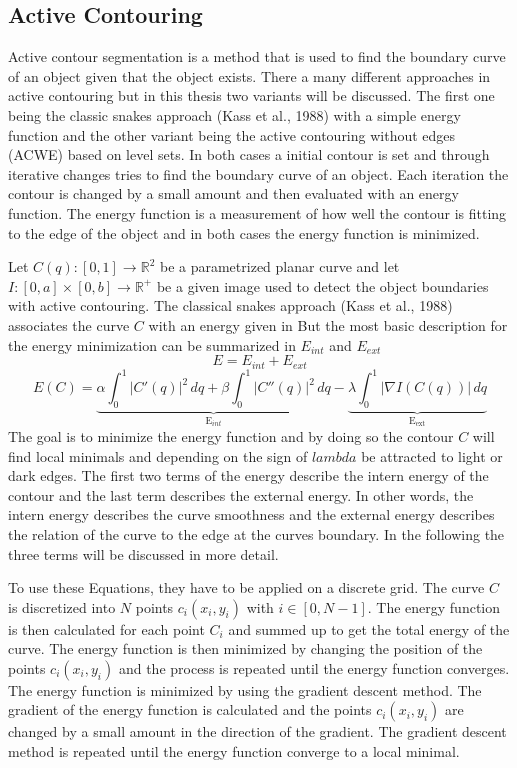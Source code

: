 \subsection{Active Contouring }
Active contour \cite{vondracek_image_2018} segmentation is a method that is used to find the boundary curve of an object given that the object exists. There a many different approaches in active contouring but in this thesis two variants will be discussed. The first one being the classic snakes approach (Kass et al., 1988) \cite{kass_snakes_1988} with a simple energy function and the other variant being the active contouring without edges (ACWE)  based on level sets. In both cases a initial contour is set and through iterative changes tries to find the boundary curve of an object. Each iteration the contour is changed by a small amount and then evaluated with an energy function. The energy function is a measurement of how well the contour is fitting to the edge of the object and in both cases the energy function is minimized.

Let $C(q): [0, 1] \rightarrow \mathbb{R}^2$ be a parametrized planar curve and let $I : [0, a] \times [0, b] \rightarrow \mathbb{R}^+$ be a given image used to detect the object boundaries with active contouring. The classical snakes approach (Kass et al., 1988) \cite{kass_snakes_1988} associates the curve $C$ with an energy given in 
But the most basic description for the energy minimization can be summarized in $E_{int}$ and $E_{ext}$ 
\begin{equation}
    E = E_{int} + E_{ext}
    \label{energy}
\end{equation}
\begin{equation}
        E(C) = \underbrace{\alpha \int_0^1 |C'(q)|^2 \, dq + \beta \int_0^1 |C''(q)|^2 \, dq}_{\text{E}_{int}} - \underbrace{\lambda \int_0^1 |\nabla I (C(q))| \, dq}_{\text{E}_{\text{ext}}}
\label{acgd}
\end{equation}
The goal is to minimize the energy function and by doing so the contour $C$ will find local minimals and depending on the sign of $lambda$ be attracted to light or dark edges. The first two terms of the energy describe the intern energy of the contour and the last term describes the external energy. In other words, the intern energy describes the curve smoothness and the external energy describes the relation of the curve to the edge at the curves boundary. In the following the three terms will be discussed in more detail.

To use these Equations, they have to be applied on a discrete grid. The curve $C$ is discretized into $N$ points  $c_i(x_i,y_i)$ with $i \in [0, N-1]$. The energy function is then calculated for each point $C_i$ and summed up to get the total energy of the curve. The energy function is then minimized by changing the position of the points $c_i(x_i,y_i)$ and the process is repeated until the energy function converges. The energy function is minimized by using the gradient descent method. The gradient of the energy function is calculated and the points $c_i(x_i,y_i)$ are changed by a small amount in the direction of the gradient. The gradient descent method is repeated until the energy function converge to a local minimal. 

